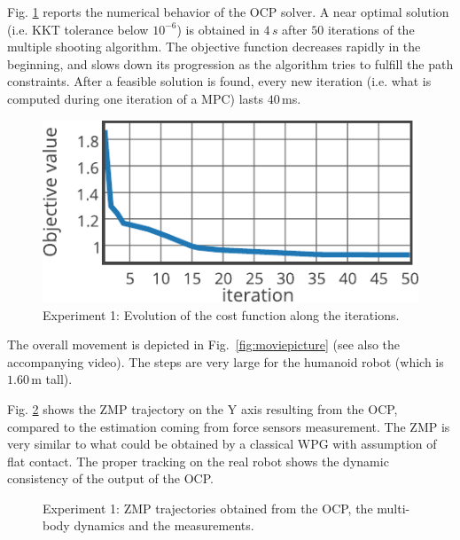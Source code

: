 Fig. \ref{fig:objective_walk} reports the numerical behavior of the OCP solver. A near optimal solution (i.e. KKT tolerance below $10^{-6}$) is obtained in $4\,s$ after $50$ iterations of the multiple shooting algorithm. The objective function decreases rapidly in the beginning, and slows down its progression as the algorithm tries to fulfill the path constraints. After a feasible solution is found, every new iteration (i.e. what is computed during one iteration of a MPC) lasts $40\,$ms.
\begin{figure}[!ht]
	\centering
	\includegraphics[height=0.25\linewidth]{./Multicontact/MulticontactJustin/fig/objective_function_walk.pdf}
		\caption{Experiment 1: Evolution of the cost function along the iterations.}
		\label{fig:objective_walk}
\end{figure}
The overall movement is depicted in Fig.~\ref{fig:moviepicture} (see also the accompanying video). The steps are very large for the humanoid robot (which is $1.60\,$m tall).

Fig. \ref{fig:zmp_walk} shows the ZMP trajectory on the Y axis resulting from the OCP, compared to the estimation coming from force sensors measurement. The ZMP is very similar to what could be obtained by a classical WPG with assumption of flat contact. The proper tracking on the real robot shows the dynamic consistency of the output of the OCP.

\begin{figure}[!ht]
	\centering
	\caption{Experiment 1: ZMP trajectories obtained from the OCP, the multi-body dynamics and the measurements.}
		\label{fig:zmp_walk}
\end{figure}

